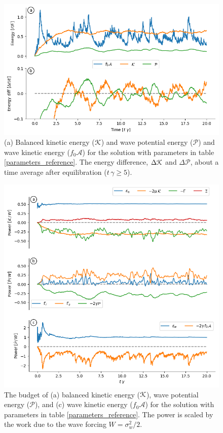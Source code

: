 \documentclass[12pt]{article}
\renewcommand{\P}{\mathcal{P}}
\newcommand{\A}{  \mathcal{A}}
\begin{document}
\begin{figure}
\centering
\includegraphics[width=.825\textwidth]{figs/energies_reference.png}
\caption{(a) Balanced kinetic energy ($\mathcal{K}$) and wave potential energy ($\P$) and wave
         kinetic energy ($f_0 \A$)  for the solution with parameters in table
         \ref{parameters_reference}. The energy difference, $\Delta \mathcal{K}$ and $\Delta \P$,
         about a time average after equilibration ($t\,\gamma \ge 5$).}
        \label{energies_reference}
\end{figure}

\begin{figure}
\centering
\includegraphics[width=.825\textwidth]{figs/K_and_P_and_A_budget_reference.png}
\caption{The budget of (a) balanced kinetic energy ($\mathcal{K}$), wave potential energy ($\P$),
        and (c) wave
         kinetic energy ($f_0 \A$)  for the solution with parameters in table
         \ref{parameters_reference}. The power is scaled by the work due to the
         wave forcing $W=\sigma_w^2/2$.}
        \label{energies_reference}
\end{figure}
\end{document}
